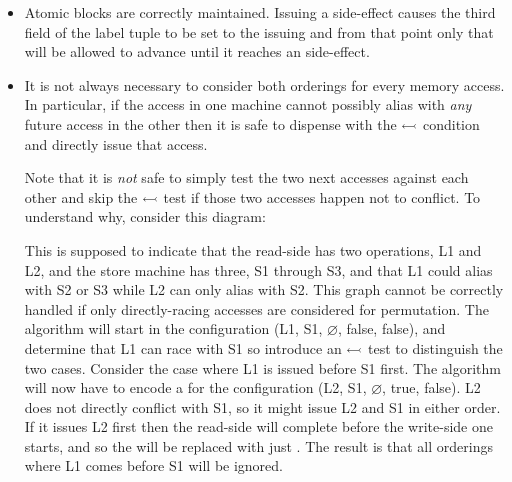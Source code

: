 \begin{itemize}
\item
  Atomic blocks are correctly maintained.  Issuing a
   side-effect causes the third field of the label
  tuple to be set to the issuing {\StateMachine} and from that point
  only that {\StateMachine} will be allowed to advance until it
  reaches an  side-effect.  

\item
  It is not always necessary to consider both orderings for every
  memory access.  In particular, if the access in one machine cannot
  possibly alias with \emph{any} future access in the other then it is
  safe to dispense with the $\leftarrowtail$ condition and directly
  issue that access.


  Note that it is \emph{not} safe to simply test the two next accesses
  against each other and skip the $\leftarrowtail$ test if those two
  accesses happen not to conflict.  To understand why, consider this
  diagram:



  This is supposed to indicate that the read-side {\StateMachine} has
  two operations, L1 and L2, and the store machine has three, S1
  through S3, and that L1 could alias with S2 or S3 while L2 can only
  alias with S2.  This graph cannot be correctly handled if only
  directly-racing accesses are considered for permutation.  The
  algorithm will start in the configuration (L1, S1, $\varnothing$,
  false, false), and determine that L1 can race with S1 so introduce
  an $\leftarrowtail$ test to distinguish the two cases.  Consider the
  case where L1 is issued before S1 first.  The algorithm will now
  have to encode a {\StateMachine} for the configuration (L2, S1,
  $\varnothing$, true, false).  L2 does not directly conflict with S1,
  so it might issue L2 and S1 in either order.  If it issues L2 first
  then the read-side {\StateMachine} will complete before the
  write-side one starts, and so the {\StateMachine} will be replaced
  with just .  The result is that all orderings where
  L1 comes before S1 will be ignored.


\end{itemize}
